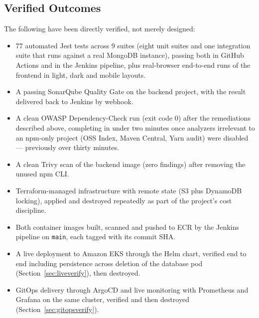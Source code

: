 \documentclass[11pt,a4paper]{article}
\begin{document}
\subsection{Verified Outcomes}
The following have been directly verified, not merely designed:
\begin{itemize}[nosep]
    \item 77 automated Jest tests across 9 suites (eight unit suites and one
        integration suite that runs against a real MongoDB instance), passing
        both in GitHub Actions and in the Jenkins pipeline, plus real-browser
        end-to-end runs of the frontend in light, dark and mobile layouts.
    \item A passing SonarQube Quality Gate on the backend project, with the
        result delivered back to Jenkins by webhook.
    \item A clean OWASP Dependency-Check run (exit code 0) after the
        remediations described above, completing in under two minutes once
        analyzers irrelevant to an npm-only project (OSS Index, Maven
        Central, Yarn audit) were disabled --- previously over thirty
        minutes.
    \item A clean Trivy scan of the backend image (zero findings) after
        removing the unused npm CLI.
    \item Terraform-managed infrastructure with remote state (S3 plus
        DynamoDB locking), applied and destroyed repeatedly as part of the
        project's cost discipline.
    \item Both container images built, scanned and pushed to ECR by the
        Jenkins pipeline on \texttt{main}, each tagged with its commit SHA.
    \item A live deployment to Amazon EKS through the Helm chart, verified
        end to end including persistence across deletion of the database pod
        (Section~\ref{sec:liveverify}), then destroyed.
    \item GitOps delivery through ArgoCD and live monitoring with Prometheus
        and Grafana on the same cluster, verified and then destroyed
        (Section~\ref{sec:gitopsverify}).
\end{itemize}

\end{document}
